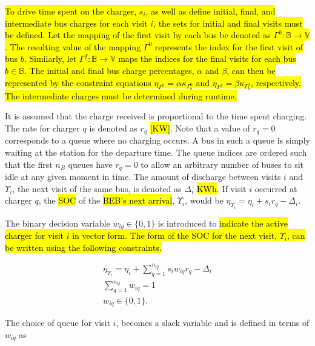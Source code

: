 \documentclass[utf8]{FrontiersinHarvard}
\begin{document}
\hl{To drive time spent on the charger, $s_i$, as well as define initial, final, and intermediate bus charges for each
  visit $i$, the sets for initial and final visits must be defined. Let the mapping of the first visit by each bus be
  denoted as $\Gamma^0 : \mathbb{B} \rightarrow \mathbb{V}$. The resulting value of the mapping $\Gamma^0$ represents
  the index for the first visit of bus $b$. Similarly, let $\Gamma^f : \mathbb{B} \rightarrow \mathbb{V}$ maps the
  indices for the final visits for each bus $b \in \mathbb{B}$. The initial and final bus charge percentages, $\alpha$
  and $\beta$, can then be represented by the constraint equations $\eta_{\Gamma^0} = \alpha \kappa_{\Gamma^0_b}$ and
  $\eta_{\Gamma^f} = \beta \kappa_{\Gamma^f_b}$, respectively. The intermediate charges must be determined during
  runtime.}

It is assumed that the charge received is proportional to the time spent charging. The rate for charger \(q\) is denoted
as \(r_q\) \hl{[KW]}. Note that a value of \(r_q = 0\) corresponds to a queue where no charging occurs. A bus in
such a queue is simply waiting at the station for the departure time. The queue indices are ordered such that the first
\(n_B\) queues have \(r_q = 0\) to allow an arbitrary number of buses to sit idle at any given moment in time. The amount of
discharge between visits \(i\) and \(\Upsilon_i\), the next visit of the same bus, is denoted as \(\Delta_i\) \hl{KWh}. If
visit \(i\) occurred at charger \(q\), the \hl{SOC} of the \hl{BEB's next arrival}, \(\Upsilon_i\), would be
\(\eta_{\Upsilon_i} = \eta_i + s_i r_q - \Delta_i\).

The binary decision variable \(w_{iq} \in \{0,1\}\) is introduced to \hl{indicate the active charger for visit $i$ in vector form. The form of the SOC for the next visit, $\Upsilon_i$, can be written using the following constraints.}

\begin{subequations}
    \label{subeq:pre_next_charge}
\begin{align}
    \eta_{\Upsilon_i} = \eta_i + \sum_{q=1}^{n_Q} s_i w_{iq} r_q - \Delta_i \\
    \sum_{q=1}^{n_Q} w_{iq} = 1                           \\
    w_{iq} \in \{0,1\}.
\end{align}
\end{subequations}

The choice of queue for visit \(i\), becomes a slack variable and is defined in terms of \(w_{iq}\) as
\end{document}
